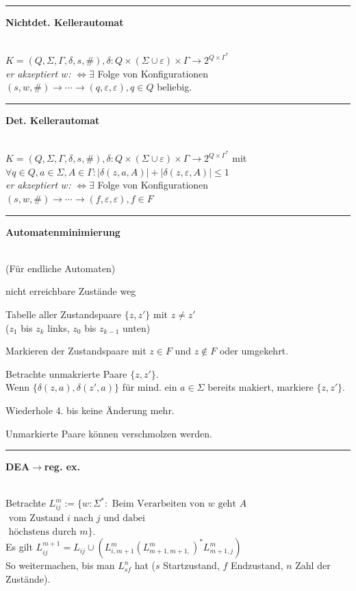 \documentclass{article}
\newcommand{\hh}[1]{{\vspace{1pt}\hrule\vspace{1pt} \noindent\textbf{#1}}\\}
\newcommand{\hhh}[1]{{\vspace{1pt}\noindent\emph{#1:}}}
\newcounter{Lcount}
\newenvironment{tightenum}{
\begin{list}{\arabic{Lcount}.}{
\usecounter{Lcount}
\setlength{\topsep}{-1ex}
\setlength{\itemsep}{-1ex}
\setlength{\leftmargin}{4ex}}
}{
\end{list}
\vspace{1ex}
}
\begin{document}
\begin{multicols}{4}
\hh{Nichtdet. Kellerautomat}
$K=(Q, \Sigma, \Gamma, \delta, s, \#), \delta: Q\times(\Sigma\cup\varepsilon)\times\Gamma\to 2^{Q\times\Gamma^*}$\\
\hhh{er akzeptiert $w$} $\Leftrightarrow\exists$ Folge von Konfigurationen $(s, w, \#)\to\cdots\to(q, \varepsilon, \varepsilon), q\in Q$ beliebig.\\
\hh{Det. Kellerautomat}
$K=(Q, \Sigma, \Gamma, \delta, s, \#), \delta: Q\times(\Sigma\cup\varepsilon)\times\Gamma\to 2^{Q\times\Gamma^*}$ mit $\forall q\in Q, a\in\Sigma, A\in\Gamma:|\delta(z, a, A)|+|\delta(z, \varepsilon, A)|\le 1$\\
\hhh{er akzeptiert $w$} $\Leftrightarrow\exists$ Folge von Konfigurationen $(s, w, \#)\to\cdots\to(f, \varepsilon, \varepsilon), f\in F$\\
\hh{Automatenminimierung}
(Für endliche Automaten)
\begin{tightenum}
\item nicht erreichbare Zustände weg \\
\item Tabelle aller Zustandspaare $\{z,z'\}$ mit $z \neq z'$ \\
($z_1$ bis $z_k$ links, $z_0$ bis $z_{k-1}$ unten) \\
\item Markieren der Zustandspaare mit $z \in F$ und $z \notin F$ oder umgekehrt. \\
\item Betrachte unmakrierte Paare $\{z,z'\}$. \\
Wenn $\{\delta(z,a),\delta(z',a)\}$ für mind. ein $a \in \Sigma$ bereits makiert, markiere $\{z,z'\}$. \\
\item Wiederhole 4. bis keine Änderung mehr. \\
\item Unmarkierte Paare können verschmolzen werden. \\ 
\end{tightenum}

\hh{DEA$\to$reg. ex.}

Betrachte $L_{ij}^m := \{w:\Sigma^*:\text{ Beim Verarbeiten von $w$ geht $A$}$\\$\text{ vom Zustand $i$ nach $j$ und dabei}$\\$\text{ höchstens durch $m$}\}$.\\
Es gilt $L_{ij}^{m+1} = L_{ij}\cup\left( L_{i,m+1}^m (L_{m+1,m+1,}^m)^* L_{m+1,j}^m\right)$\\
So weitermachen, bis man $L_{sf}^n$ hat ($s$ Startzustand, $f$ Endzustand, $n$ Zahl der Zustände).


\end{multicols}
\end{document}
